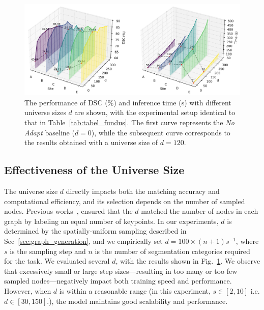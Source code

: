 \begin{figure}[!t]
    \centering
\includegraphics[width=0.999\linewidth]{Figures/comparison_dsc_time_labeled.png}
    \caption{The performance of DSC (\%) and inference time (s) with different universe sizes $d$ are shown, with the experimental setup identical to that in Table~\ref{tab:tabel_fundus}. The first curve represents the \textit{No Adapt} baseline ($d = 0$), while the subsequent curve corresponds to the results obtained with a universe size of $ d = 120$.}
     \vspace{-0.5cm}
    \label{fig:universe_d}
\end{figure}

\vspace{-5pt}
\subsection{Effectiveness of the Universe Size}
The universe size $d$ directly impacts both the matching accuracy and computational efficiency, and its selection depends on the number of sampled nodes. Previous works~\cite{bernard2019hippi,wang2020graduated,nurlanov2023universe}, ensured that the $d$ matched the number of nodes in each graph by labeling an equal number of keypoints. In our experiments, $d$ is determined by the spatially-uniform sampling described in Sec~\ref{sec:graph_generation}, and we empirically set $d = 100\times (n+1) s^{-1}$, where $s$ is the sampling step and $n$ is the number of segmentation categories required for the task. We evaluated several $d$, with the results shown in Fig.~\ref{fig:universe_d}. We observe that excessively small or large step sizes—resulting in too many or too few sampled nodes—negatively impact both training speed and performance. However, when $d$ is within a reasonable range (in this experiment, $s \in[2, 10]$ i.e. $d \in [30, 150]$.), the model maintains good scalability and performance.

